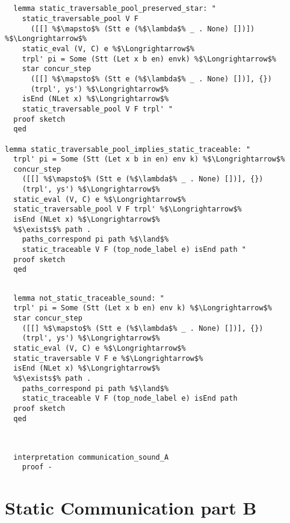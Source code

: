 \documentclass{article}
\begin{document}
\begin{lstlisting}[style=codestyle1, escapechar=\%]


  lemma static_traversable_pool_preserved_star: "
    static_traversable_pool V F
      ([[] %$\mapsto$% (Stt e (%$\lambda$% _ . None) [])]) %$\Longrightarrow$%
    static_eval (V, C) e %$\Longrightarrow$%
    trpl' pi = Some (Stt (Let x b en) envk) %$\Longrightarrow$%
    star concur_step
      ([[] %$\mapsto$% (Stt e (%$\lambda$% _ . None) [])], {})
      (trpl', ys') %$\Longrightarrow$%
    isEnd (NLet x) %$\Longrightarrow$%
    static_traversable_pool V F trpl' "
  proof sketch
  qed

lemma static_traversable_pool_implies_static_traceable: "
  trpl' pi = Some (Stt (Let x b in en) env k) %$\Longrightarrow$%
  concur_step
    ([[] %$\mapsto$% (Stt e (%$\lambda$% _ . None) [])], {})
    (trpl', ys') %$\Longrightarrow$% 
  static_eval (V, C) e %$\Longrightarrow$%
  static_traversable_pool V F trpl' %$\Longrightarrow$%
  isEnd (NLet x) %$\Longrightarrow$%
  %$\exists$% path . 
    paths_correspond pi path %$\land$%
    static_traceable V F (top_node_label e) isEnd path "
  proof sketch
  qed
  \end{lstlisting}


\begin{lstlisting}[style=codestyle1, escapechar=\%]

  lemma not_static_traceable_sound: "
  trpl' pi = Some (Stt (Let x b en) env k) %$\Longrightarrow$%
  star concur_step
    ([[] %$\mapsto$% (Stt e (%$\lambda$% _ . None) [])], {})
    (trpl', ys') %$\Longrightarrow$% 
  static_eval (V, C) e %$\Longrightarrow$%
  static_traversable V F e %$\Longrightarrow$%
  isEnd (NLet x) %$\Longrightarrow$%
  %$\exists$% path . 
    paths_correspond pi path %$\land$%
    static_traceable V F (top_node_label e) isEnd path
  proof sketch
  qed
  \end{lstlisting}


\begin{lstlisting}[style=codestyle1, escapechar=\%]


  interpretation communication_sound_A
    proof -

  \end{lstlisting}



\section{Static Communication part B}
\end{document}
